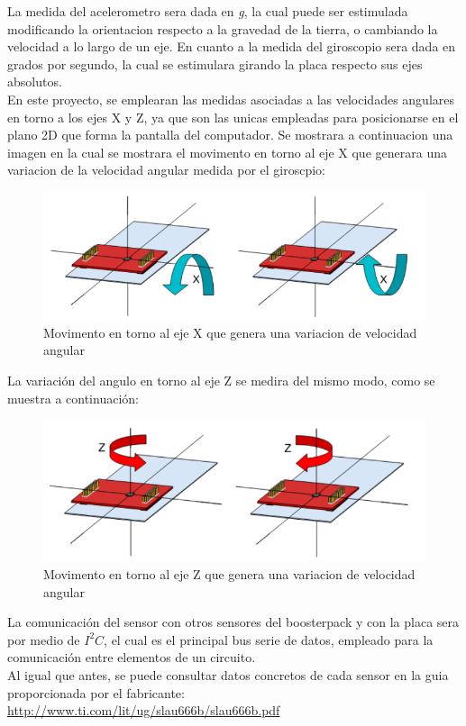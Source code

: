 \documentclass[a4paper,twoside]{article}
\begin{document}
La medida del acelerometro sera dada en \textit{g}, la cual puede ser estimulada modificando la orientacion respecto a la gravedad de la tierra, o cambiando la velocidad a lo largo de un eje. En cuanto a la medida del giroscopio sera dada en grados por segundo, la cual se estimulara girando la placa respecto sus ejes absolutos. \\
En este proyecto, se emplearan las medidas asociadas a las velocidades angulares en torno a los ejes X y Z, ya que son las unicas empleadas para posicionarse en el plano 2D que forma la pantalla del computador. Se mostrara a continuacion una imagen en la cual se mostrara el movimento en torno al eje X que generara una variacion de la velocidad angular medida por el giroscpio:\\
\begin{figure}[h!]
 \centering
 \includegraphics[width=.6\textwidth]{../images/mov_axisX_bmi}
 \caption{Movimento en torno al eje X que genera una variacion de velocidad angular}
\end{figure}

La variación del angulo en torno al eje Z se medira del mismo modo, como se muestra a continuación: \\
\begin{figure}[h!]
 \centering
 \includegraphics[width=.6\textwidth]{../images/mov_axisZ_bmi}
 \caption{Movimento en torno al eje Z que genera una variacion de velocidad angular}
\end{figure}

\newpage
La comunicación del sensor con otros sensores del boosterpack y con la placa sera por medio de $I^2C$, el cual es el principal bus serie de datos, empleado para la comunicación entre elementos de un circuito. \\

Al igual que antes, se puede consultar datos concretos de cada sensor en la guia proporcionada por el fabricante:
\url{http://www.ti.com/lit/ug/slau666b/slau666b.pdf}
\end{document}
